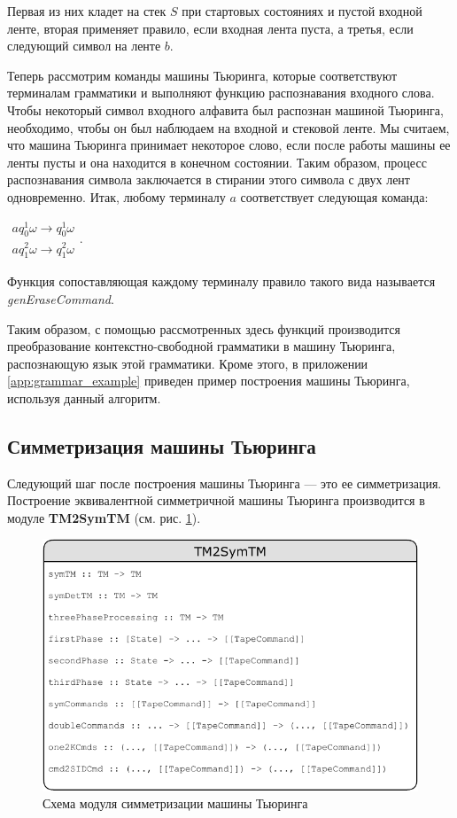 \documentclass[14pt]{matmex-diploma-custom}
\begin{document}
Первая из них кладет на стек $S$ при стартовых состояниях и пустой входной ленте, вторая применяет правило, если входная лента пуста, а третья, если следующий символ на ленте $b$.  

Теперь рассмотрим команды машины Тьюринга, которые соответствуют терминалам грамматики и выполняют
функцию распознавания входного слова. Чтобы некоторый символ входного алфавита был распознан 
машиной Тьюринга, необходимо, чтобы он был наблюдаем на входной и стековой ленте. Мы считаем, что
машина Тьюринга принимает некоторое слово, если после работы машины ее ленты пусты и она находится в
конечном состоянии. Таким образом, процесс распознавания символа заключается в стирании этого символа
с двух лент одновременно. Итак, любому терминалу $a$ соответствует следующая команда:

$\begin{array}{lcl}
    a q_0^1 \omega \to q_0^1 \omega \\
    a q_1^2 \omega \to q_1^2 \omega 
\end{array}$. 

Функция сопоставляющая каждому терминалу правило такого вида называется \textit{genEraseCommand}.

Таким образом, с помощью рассмотренных здесь функций производится преобразование контекстно-свободной грамматики в машину Тьюринга, распознающую язык этой грамматики. Кроме этого, в приложении \ref{app:grammar_example} приведен пример построения машины Тьюринга, используя данный алгоритм. 

\subsection{Симметризация машины Тьюринга}
Следующий шаг после построения машины Тьюринга --- это ее симметризация. Построение эквивалентной симметричной машины Тьюринга производится в модуле \textbf{TM2SymTM} (см. рис. \ref{fig:TM2SymTM}).

\begin{figure}[H]
\centering
  \includegraphics[width=\linewidth]{pics/TM2SymTM.pdf}
  \caption{Схема модуля симметризации машины Тьюринга}
  \label{fig:TM2SymTM}
\end{figure}
\end{document}
